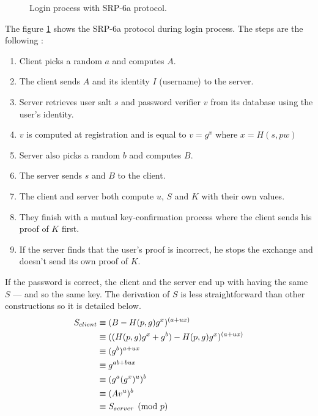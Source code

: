 ﻿\documentclass[../report.tex]{subfiles}
\begin{document}
\begin{figure}[h]
 \centering
 \setlength{\fboxsep}{10pt}
 \setlength{\fboxrule}{1pt}
 \caption{Login process with SRP-6a protocol.}
 \label{fig:SRP}
\end{figure}
The figure \ref{fig:SRP} shows the SRP-6a protocol during login process.
The steps are the following :
\begin{enumerate}
 \item Client picks a random $a$ and computes $A$.
 \item The client sends $A$ and its identity $I$ (username) to the server.
 \item Server retrieves user salt $s$ and password verifier $v$ from its database using the user's identity.
 \item $v$ is computed at registration and is equal to $v = g^x$ where $x = H(s, pw)$
 \item Server also picks a random $b$ and computes $B$.
 \item The server sends $s$ and $B$ to the client.
 \item The client and server both compute $u$, $S$ and $K$ with their own values.
 \item They finish with a mutual key-confirmation process where the client sends his proof of $K$ first.
 \item If the server finds that the user's proof is incorrect, he stops the exchange and doesn't send its own proof of $K$.
\end{enumerate}
If the password is correct, the client and the server end up with having the same $S$ --- and so the same key. The derivation of $S$ is less straightforward than other constructions so it is detailed below.
\begin{align*}
 S_{client}
 &\equiv (B - H(p, g) g^x)^{(a+ux)}\notag\\
 &\equiv ((H(p, g) g^x + g^b) - H(p, g) g^x)^{(a+ux)}\notag\\
 &\equiv (g^b)^{a+ux}\notag\\
 &\equiv g^{ab+bux}\notag\\
 &\equiv (g^a (g^x)^u)^b\notag\\
 &\equiv (Av^u)^b\notag\\
 &\equiv S_{server} \pmod{p}
\end{align*}
\end{document}
